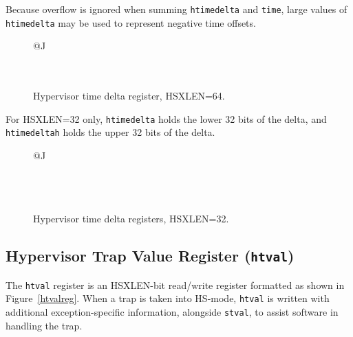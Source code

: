 \begin{commentary}
Because overflow is ignored when summing {\tt htimedelta} and {\tt time},
large values of {\tt htimedelta} may be used to represent negative time
offsets.
\end{commentary}

\begin{figure*}[h!]
{\footnotesize
\begin{center}
\begin{tabular}{@{}J}
 \\
\hline
{} \\
 \\
\end{tabular}
\end{center}
}
\vspace{-0.1in}
\caption{Hypervisor time delta register, HSXLEN=64.}
\label{hdeltareg}
\end{figure*}

For HSXLEN=32 only, {\tt htimedelta} holds the lower 32 bits of the
delta, and {\tt htimedeltah} holds the upper 32 bits of the delta.

\begin{figure*}[h!]
{\footnotesize
\begin{center}
\begin{tabular}{@{}J}
 \\
\hline
{} \\
\hline
{} \\
 \\
\end{tabular}
\end{center}
}
\vspace{-0.1in}
\caption{Hypervisor time delta registers, HSXLEN=32.}
\label{hdeltahreg}
\end{figure*}

\subsection{Hypervisor Trap Value Register ({\tt htval})}

The {\tt htval} register is an HSXLEN-bit read/write register formatted
as shown in Figure~\ref{htvalreg}.
When a trap is taken into HS-mode, {\tt htval} is written with additional
exception-specific information, alongside {\tt stval}, to assist software
in handling the trap.

